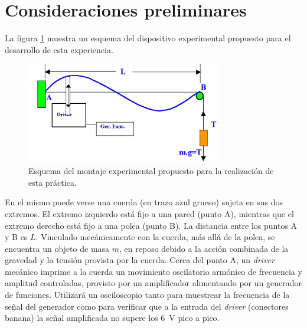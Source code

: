 \documentclass[laboratorio]{guia}
\begin{document}
 
\maketitle


\section{Consideraciones preliminares}
La figura \ref{fig:1} muestra un esquema del dispositivo experimental propuesto para el desarrollo de esta experiencia.
\begin{figure}[htb]
    \centering
    \includegraphics[width=8.5cm]{LG07--004.png}
    \caption{Esquema del montaje experimental propuesto para la realización de esta práctica.}
    \label{fig:1}
\end{figure}

En el mismo puede verse una cuerda (en trazo azul grueso) sujeta en sus dos extremos.
El extremo izquierdo está fijo a una pared (punto A), mientras que el extremo derecho está fijo a una polea (punto B).
La distancia entre los puntos A y B es \(L\).
Vinculado mecánicamente con la cuerda, más allá de la polea, se encuentra un objeto de masa \(m\), en reposo debido a la acción combinada de la gravedad y la tensión provista por la cuerda.
Cerca del punto A, un \textit{driver} mecánico imprime a la cuerda un movimiento oscilatorio armónico de frecuencia y amplitud controladas, provisto por un amplificador alimentando por un generador de funciones.
Utilizará un osciloscopio tanto para muestrear la frecuencia de la señal del generador como para verificar que a la entrada del \textit{driver} (conectores banana) la señal amplificada no supere los \SI{6}{\volt} pico a pico.
\end{document}
